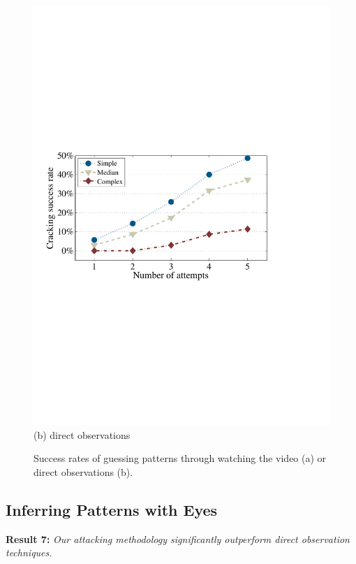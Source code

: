 \begin{figure}[!t]
{\begin{minipage}[t]{0.45\textwidth}
                \includegraphics[width=\textwidth]{fig/look-finger.pdf}\\
                \centering  (b) direct observations
                \end{minipage}
            }
            \vspace{-2mm}
            \caption{Success rates of guessing patterns through watching the video (a) or direct observations (b).}
            \label{fig:look-unlocking process}
        \end{figure}

    \subsection{Inferring Patterns with Eyes}

    \noindent \textbf{Result 7:} \emph{Our attacking methodology significantly outperform direct observation techniques.}

